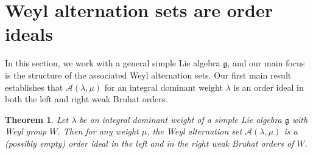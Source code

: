 \documentclass{amsart}
\newtheorem{theorem}{Theorem}[section]
\theoremstyle{definition}
\newcommand{\calA}{\mathcal{A}}
\begin{document}
\section{Weyl alternation sets are order ideals}\label{sec:ideals}
In this section, we work with a general simple Lie algebra $\mathfrak{g}$, and our main focus is the structure of the associated Weyl alternation sets.
Our first main result establishes that $\calA(\lambda,\mu)$ for an integral dominant weight $\lambda$ is an order ideal in both the left and right weak Bruhat orders. 
\begin{theorem}\label{prop:ideal_conditions_on_lambda}
    Let $\lambda$ be an integral dominant weight of a simple Lie algebra $\mathfrak{g}$ with Weyl group $W$. Then for any weight $\mu$, the Weyl alternation set $\calA(\lambda,\mu)$ is a (possibly empty) order ideal in the left and in the right weak Bruhat orders of $W$.
\end{theorem}
\end{document}
